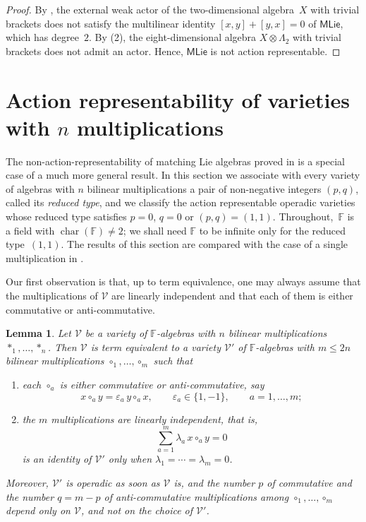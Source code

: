 \documentclass[reqno,a4paper]{amsart}
\theoremstyle{plain}
\newtheorem{lemma}[subsection]{Lemma}
\theoremstyle{definition}
\theoremstyle{remark}
\numberwithin{equation}{section}
\newcommand{\F}{\mathbb{F}}
\newcommand{\V}{\mathcal{V}}
\DeclareMathOperator{\bchar}{char}
\newcommand{\MatchLie}{\ensuremath{\mathsf{MLie}}}
\begin{document}
\begin{proof}
By , the external weak actor of the two-dimensional algebra~$X$ with trivial brackets does not satisfy the multilinear identity $[x,y]+[y,x]=0$ of $\MatchLie$, which has degree~$2$. By (2), the eight-dimensional algebra $X\otimes\Lambda_2$ with trivial brackets does not admit an actor. Hence, $\MatchLie$ is not action representable.
\end{proof}

\section{Action representability of varieties with \texorpdfstring{$n$}{n} multiplications}\label{SecNLieBracketsAR2}

The non-action-representability of matching Lie algebras proved in  is a special case of a much more general result. In this section we associate with every variety of algebras with $n$ bilinear multiplications a pair of non-negative integers $(p,q)$, called its \emph{reduced type}, and we classify the action representable operadic varieties whose reduced type satisfies $p=0$, $q=0$ or $(p,q)=(1,1)$. Throughout,~$\F$ is a field with $\bchar(\F)\neq2$; we shall need $\F$ to be infinite only for the reduced type~$(1,1)$. The results of this section are compared with the case of a single multiplication in .

Our first observation is that, up to term equivalence, one may always assume that the multiplications of $\V$ are linearly independent and that each of them is either commutative or anti-commutative.

\begin{lemma}\label{LemReduction}
Let $\V$ be a variety of $\F$-algebras with $n$ bilinear multiplications $\ast_1,\ldots,\ast_n$. Then $\V$ is term equivalent to a variety $\V'$ of $\F$-algebras with $m\leq2n$ bilinear multiplications $\circ_1,\ldots,\circ_m$ such that
\begin{enumerate}
\item each $\circ_a$ is either commutative or anti-commutative, say
\[
x\circ_ay=\varepsilon_a\,y\circ_ax,
\qquad
\varepsilon_a\in\{1,-1\},
\qquad
a=1,\ldots,m;
\]
\item the $m$ multiplications are linearly independent, that is,
\[
\sum_{a=1}^{m}\lambda_a\,x\circ_ay=0
\]
is an identity of $\V'$ only when $\lambda_1=\cdots=\lambda_m=0$.
\end{enumerate}
Moreover, $\V'$ is operadic as soon as $\V$ is, and the number $p$ of commutative and the number $q=m-p$ of anti-commutative multiplications among $\circ_1,\ldots,\circ_m$ depend only on $\V$, and not on the choice of $\V'$.
\end{lemma}
\end{document}
